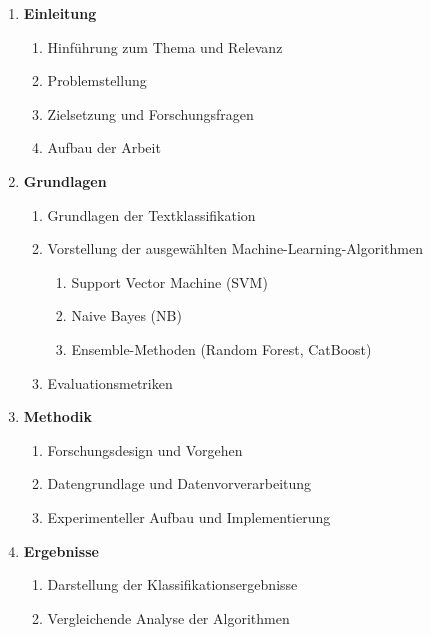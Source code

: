 \begin{enumerate}[leftmargin=*, label=\arabic*, font=\bfseries, noitemsep]
	\item\textbf{Einleitung}
	      \begin{enumerate}[label=\theenumi.\arabic*, noitemsep]
		      \item Hinführung zum Thema und Relevanz
		      \item Problemstellung
		      \item Zielsetzung und Forschungsfragen
		      \item Aufbau der Arbeit
	      \end{enumerate}

	\item\textbf{Grundlagen}
	      \begin{enumerate}[label=\theenumi.\arabic*, noitemsep]
		      \item Grundlagen der Textklassifikation
		      \item Vorstellung der ausgewählten Machine-Learning-Algorithmen
		            \begin{enumerate}[label=\theenumii.\arabic*, noitemsep]
			            \item Support Vector Machine (SVM)
			            \item Naive Bayes (NB)
			            \item Ensemble-Methoden (Random Forest, CatBoost)
		            \end{enumerate}
		      \item Evaluationsmetriken
	      \end{enumerate}

	\item\textbf{Methodik}
	      \begin{enumerate}[label=\theenumi.\arabic*, noitemsep]
		      \item Forschungsdesign und Vorgehen
		      \item Datengrundlage und Datenvorverarbeitung
		      \item Experimenteller Aufbau und Implementierung
	      \end{enumerate}

	\item\textbf{Ergebnisse}
	      \begin{enumerate}[label=\theenumi.\arabic*, noitemsep]
		      \item Darstellung der Klassifikationsergebnisse
		      \item Vergleichende Analyse der Algorithmen
	      \end{enumerate}


\end{enumerate}
